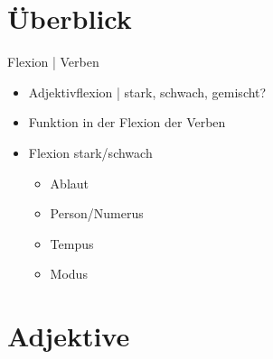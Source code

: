 \section{Überblick}

\begin{frame}
  {Flexion | Verben}
  \onslide<+->
  \begin{itemize}[<+->]
    \item Adjektivflexion | stark, schwach, gemischt?
      \Zeile
    \item Funktion in der Flexion der Verben
    \item Flexion stark\slash schwach
      \begin{itemize}[<+->]
        \item Ablaut
        \item Person\slash Numerus
        \item Tempus
        \item Modus
      \end{itemize}
  \end{itemize}
\end{frame}

\section{Adjektive}

